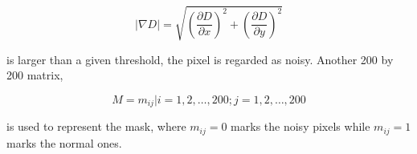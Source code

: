 \begin{equation}
|\nabla D|=\sqrt{
\left(\frac{\partial{D}}{\partial{x}}\right)^2 +
\left(\frac{\partial{D}}{\partial{y}}\right)^2
}
\end{equation}

is larger than a given threshold, the pixel is regarded as noisy. Another 200 by 200 matrix,

\begin{equation}
\label{eq:methodology:roimask}
M=m_{ij}|i=1,2,\dots,200;j=1,2,\dots,200
\end{equation}

is used to represent the mask, where $m_{ij}=0$ marks the noisy pixels while $m_{ij}=1$ marks the normal ones.
